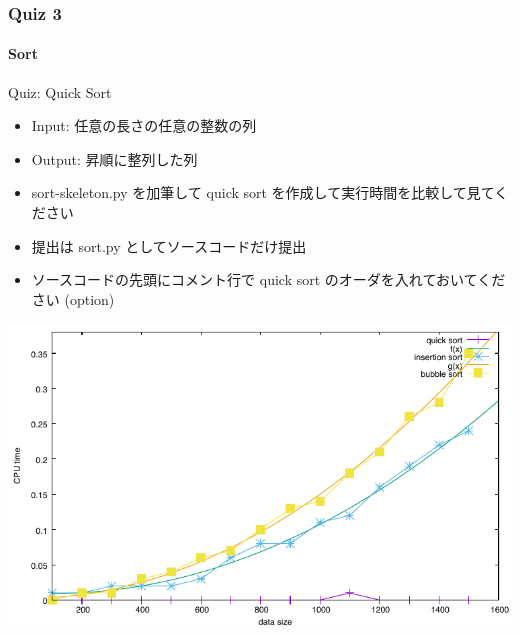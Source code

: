 \begin{frame}[shrink]
\frametitle{Quiz 3}
\framesubtitle{Sort}
  \begin{block}{Quiz: Quick Sort}
\scriptsize
    \begin{itemize}
\item Input: 任意の長さの任意の整数の列
\item Output: 昇順に整列した列
\item sort-skeleton.py を加筆して quick sort を作成して実行時間を比較して見てください
\item 提出は sort.py としてソースコードだけ提出
\item ソースコードの先頭にコメント行で quick sort のオーダを入れておいてください (option)
    \end{itemize}
  \end{block}
  \begin{center}
\includegraphics[scale=0.6]{./progs/sort.pdf}
  \end{center}
\end{frame}
